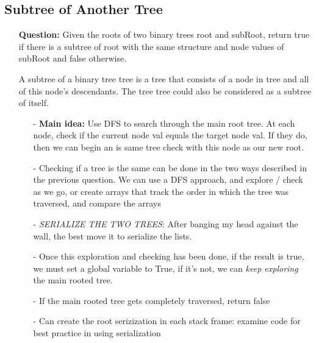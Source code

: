 \documentclass[12pt]{article}
\begin{document}
\subsection{Subtree of Another Tree}
\begin{enumerate}
  \item[] \textbf{Question:} Given the roots of two binary trees root and subRoot, return true if there is a subtree of root with the same structure and node values of subRoot and false otherwise.

A subtree of a binary tree tree is a tree that consists of a node in tree and all of this node's descendants. The tree tree could also be considered as a subtree of itself.


    \begin{enumerate}
      \item[-] \textbf{Main idea:} Use DFS to search through the main root tree. At each node, check if the current node val equals the target node val. If they do, then we can begin an is same tree check with this node as our new root. 
      \item[-] Checking if a tree is the same can be done in the two ways described in the previous question. We can use a DFS approach, and explore / check as we go, or create arrays that track the order in which the tree was traversed, and compare the arrays
      \item[-] \textit{SERIALIZE THE TWO TREES}: After banging my head against the wall, the best move it to serialize the lists.
      \item[-] Once this exploration and checking has been done, if the result is true, we must set a global variable to True, if it's not, we can  \textit{keep exploring} the main rooted tree. 
      \item[-] If the main rooted tree gets completely traversed, return false
      \item[-] Can create the root serizization in each stack frame: examine code for best practice in using serialization

    \end{enumerate}
\end{enumerate}
\end{document}
